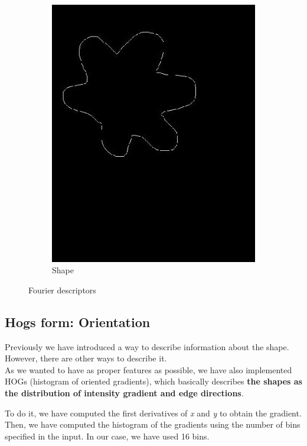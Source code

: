 \documentclass[11]{article}
\begin{document}
\begin{figure}[H]
\begin{subfigure}[t]{0.45\textwidth}
    \includegraphics[scale=0.25]{images/shape.jpg}
    \caption{Shape}
    \label{fourier2}
    \end{subfigure}
    \label{fourier}
    \caption{Fourier descriptors}
\end{figure}


\subsection{Hogs form: Orientation}
Previously we have introduced a way to describe information about the shape. However, there are other ways to describe it. 
\\
As we wanted to have as proper features as possible, we have also implemented HOGs (histogram of oriented gradients), which basically describes \textbf{the shapes as the distribution of intensity gradient and edge directions}.

To do it, we have computed the first derivatives of \textit{x} and \textit{y} to obtain the gradient. Then, we have computed the histogram of the gradients using the number of bins specified in the input. In our case, we have used 16 bins.
\end{document}
